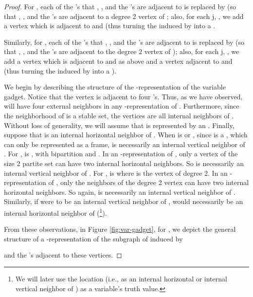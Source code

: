 \documentclass[11pt,3p,times]{elsarticle}
\newenvironment{myproof}{\begin{proof}}{\end{proof}}
\begin{document}
\begin{myproof}
For , each of the 's that , , and the
's are adjacent to is replaced by  (so that , , and the
's are adjacent to a degree 2 vertex of ; also, for each j,
, we add a vertex  which is adjacent to
 and  (thus turning the  induced by
 into a .

Similarly, for , each of the 's that , , and the
's are adjacent to is replaced by  (so that , , and the
's are adjacent to the degree 2 vertex of ); also, for each j,
, we add a vertex  which is adjacent to
 and  as above and a vertex  adjacent to
 and   (thus turning the  induced by
 into a ).

We begin by describing the structure of the -representation
of the variable gadget. Notice that the vertex  is adjacent to
four 's. Thus, as we have observed,  will have four
external neighbors in any -representation of .
Furthermore, since the neighborhood of  is a stable set, the
vertices  are all internal neighbors of . Without loss of
generality, we will assume that  is represented by an . Finally,
suppose that  is an internal horizontal neighbor of . When 
is  or ,
since  is a ,
which can only be represented as a frame,
 is necessarily an internal vertical neighbor of
. For ,
 is ,
with bipartition  and . In an
-representation of , only a vertex of the size 2 partite set
can have two internal horizontal neighbors.  So  is necessarily an
internal vertical neighbor of . For ,
 is  where
 is the vertex of degree 2.  In an -representation of , only
the neighbors of the degree 2 vertex can have two internal horizontal neighbors.
So again,  is necessarily an
internal vertical neighbor of . Similarly, if  were to be an internal vertical neighbor
of ,  would necessarily be an internal
horizontal neighbor of  (\footnote{We will later use the
location (i.e., as an internal horizontal or internal vertical
neighbor of ) as a variable's truth value.}).

From these
observations, in Figure \ref{fig:var-gadget}, for ,
we depict the general structure of a
-representation of the subgraph of  induced by
     
    and the 's adjacent to
these vertices.


\end{myproof}
\end{document}
